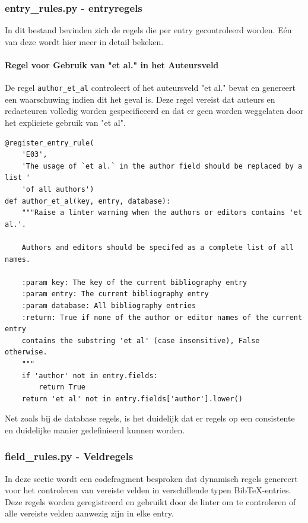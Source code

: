 
\subsubsection{entry\_rules.py - entryregels}

In dit bestand bevinden zich de regels die per entry gecontroleerd worden. Eén van deze wordt hier meer in detail bekeken.

\paragraph{Regel voor Gebruik van "et al." in het Auteursveld}

De regel \texttt{author\_et\_al} controleert of het auteursveld "et al." bevat en genereert een waarschuwing indien dit het geval is. Deze regel vereist dat auteurs en redacteuren volledig worden gespecificeerd en dat er geen worden weggelaten door het expliciete gebruik van "et al".

\begin{verbatim}
@register_entry_rule(
    'E03',
    'The usage of `et al.` in the author field should be replaced by a list '
    'of all authors')
def author_et_al(key, entry, database):
    """Raise a linter warning when the authors or editors contains 'et al.'.

    Authors and editors should be specifed as a complete list of all names.

    :param key: The key of the current bibliography entry
    :param entry: The current bibliography entry
    :param database: All bibliography entries
    :return: True if none of the author or editor names of the current entry
    contains the substring 'et al' (case insensitive), False otherwise.
    """
    if 'author' not in entry.fields:
        return True
    return 'et al' not in entry.fields['author'].lower()
\end{verbatim}

Net zoals bij de database regels, is het duidelijk dat er regels op een consistente en duidelijke manier gedefinieerd kunnen worden.


\subsubsection{field\_rules.py - Veldregels}

In deze sectie wordt een codefragment besproken dat dynamisch regels genereert voor het controleren van vereiste velden in verschillende typen BibTeX-entries. Deze regels worden geregistreerd en gebruikt door de linter om te controleren of alle vereiste velden aanwezig zijn in elke entry.

